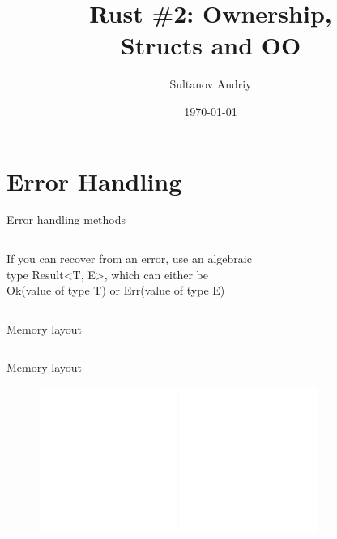 \documentclass[usenames,dvipsnames,10pt,aspectratio=169]{beamer}
\title[Rust \#2]{Rust \#2: Ownership,\\ Structs and OO}
\date[\today]{\small\today}
\author[Sultanov Andriy]{Sultanov Andriy}
\institute{APPS@UCU}
\begin{document}
\begin{frame}
\titlepage
\end{frame}

\begin{frame}{\contentsname}
\tableofcontents
\end{frame}


\section{Error Handling}

\begin{frame}{Error handling methods}

\inputminted[fontsize=\large]{c}{code/error1.rs}

If you can recover from an error, use an algebraic\\
type Result<T, E>, which can either be\\
Ok(value of type T) or Err(value of type E)
\inputminted[fontsize=\large]{c}{code/error2.rs}
\normalsize

\vskip 0.8cm

\end{frame}

\begin{frame}{Memory layout} 
\inputminted[fontsize=\large]{c}{code/stack.c}
\end{frame}

\begin{frame}{Memory layout} 

\begin{figure}[ht]
	\includegraphics[width=0.4\textwidth]{graphics/stack1.png}
  \hfill
	\includegraphics[width=0.4\textwidth]{graphics/stack2.png}
	\hfill
\end{figure}
	
\end{frame}
\end{document}
